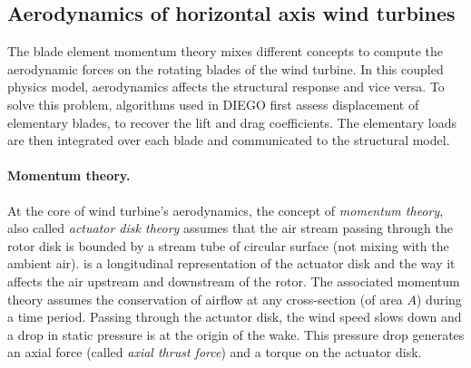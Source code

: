 \subsection{Aerodynamics of horizontal axis wind turbines}

The blade element momentum theory mixes different concepts to compute the aerodynamic forces on the rotating blades of the wind turbine. 
In this coupled physics model, aerodynamics affects the structural response and vice versa. 
To solve this problem, algorithms used in DIEGO first assess displacement of elementary blades, to recover the lift and drag coefficients. 
The elementary loads are then integrated over each blade and communicated to the structural model.


\paragraph{Momentum theory.}
At the core of wind turbine's aerodynamics, the concept of \textit{momentum theory}, also called \textit{actuator disk theory} assumes that the air stream passing through the rotor disk is bounded by a stream tube of circular surface (not mixing with the ambient air). 
 is a longitudinal representation of the actuator disk and the way it affects the air upstream and downstream of the rotor. 
The associated momentum theory assumes the conservation of airflow at any cross-section (of area $A$) during a time period. 
Passing through the actuator disk, the wind speed slows down and a drop in static pressure is at the origin of the wake. 
This pressure drop generates an axial force (called \textit{axial thrust force}) and a torque on the actuator disk.

